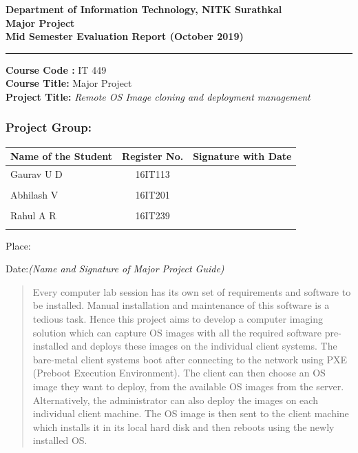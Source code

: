 \documentclass[a4paper,12pt]{article}
\begin{document}
\begin{center}
\textbf{\large{Department of Information Technology, NITK Surathkal}} \\

\textbf{\large{Major Project}} \\
\textbf{\large{Mid Semester Evaluation Report (October 2019)}} \\
\noindent\rule{12cm}{0.4pt}
\end{center}


\noindent
\textbf{Course Code :} IT 449 \\
\textbf{Course Title:} Major Project \\
\textbf{Project Title:} \emph{Remote OS Image cloning and  deployment management}   %

\subsubsection*{Project Group:}
\begin{tabular}{lcl}
\hline                         %
Name of the Student & Register No. & Signature with Date 			\\
\hline
Gaurav U D			&16IT113		&							\\\\
Abhilash V			&16IT201		&							\\\\
Rahul A R			&16IT239		&							\\\\
\hline
\end{tabular} 

\vspace{5 em}

Place:

Date:\hfill \textit{(Name and Signature of Major Project Guide)}




\newpage
         \begin{abstract}
Every computer lab session has its own set of requirements and software to be installed. Manual installation and maintenance of this software is a tedious task. Hence this project aims to develop a computer imaging solution which can capture OS images with all the required software pre-installed and deploys these images on the individual client systems.
The bare-metal client systems boot after connecting to the network using PXE (Preboot Execution Environment). The client can then choose an OS image they want to deploy,  from the available OS images from the server. Alternatively, the administrator can also deploy the images on each individual client machine. The OS image is then sent to the client machine which installs it in its local hard disk and then reboots using the newly installed OS.



	\end{abstract}
\end{document}

